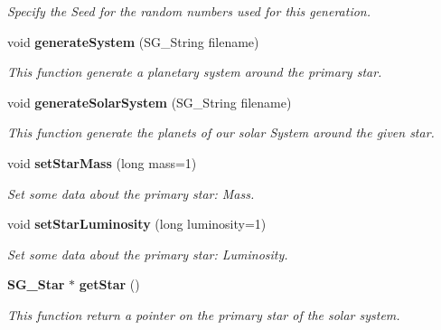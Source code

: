\begin{CompactItemize}
\begin{CompactList}\small\item\em Specify the Seed for the random numbers used for this generation. \item\end{CompactList}\item 
void {\bf generate\-System} (SG\_\-String filename)
\begin{CompactList}\small\item\em This function generate a planetary system around the primary star. \item\end{CompactList}\item 
void {\bf generate\-Solar\-System} (SG\_\-String filename)
\begin{CompactList}\small\item\em This function generate the planets of our solar System around the given star. \item\end{CompactList}\item 
void {\bf set\-Star\-Mass} (long mass=1)
\begin{CompactList}\small\item\em Set some data about the primary star: Mass. \item\end{CompactList}\item 
void {\bf set\-Star\-Luminosity} (long luminosity=1)
\begin{CompactList}\small\item\em Set some data about the primary star: Luminosity. \item\end{CompactList}\item 
{\bf SG\_\-Star} $\ast$ {\bf get\-Star} ()\label{class_s_g___solar_system_a7}

\begin{CompactList}\small\item\em This function return a pointer on the primary star of the solar system. \item\end{CompactList}\end{CompactItemize}
